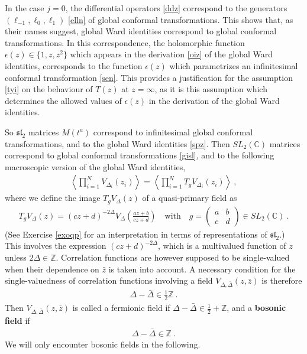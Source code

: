 \documentclass[12pt,a4paper,notitlepage]{report}
\numberwithin{equation}{section}
\theoremstyle{break}
\begin{document}
In the case $j=0$, the differential operators \eqref{ddz} correspond to the generators $(\ell_{-1},\ell_0,\ell_1)$ \eqref{elln} of global conformal transformations.
This shows that, as their names suggest, global Ward identities correspond to global conformal transformations.
In this correspondence, the holomorphic function $\epsilon(z)\in\{1,z,z^2\}$ which appears in the derivation \eqref{oiz} of the global Ward identities, corresponds to the function $\epsilon(z)$ which parametrizes an infinitesimal conformal transformation \eqref{sen}. 
This provides a justification for the assumption \eqref{tyi} on the behaviour of $T(z)$ at $z=\infty$, as it is this assumption which determines the allowed values of $\epsilon(z)$ in the derivation of the global Ward identities. 

So $\mathfrak{sl}_2$ matrices $M(t^a)$ correspond to infinitesimal global conformal transformations, and to the global Ward identities \eqref{spz}.
Then $SL_2({\mathbb{C}})$ matrices correspond to global conformal transformations \eqref{gisl}, and to the following macroscopic version of the global Ward identities,
\begin{align}
\left\langle \prod_{i=1}^N V_{\Delta_i}(z_i)\right\rangle  = \left\langle \prod_{i=1}^N T_g V_{\Delta_i}(z_i) \right\rangle \ , 
\label{vtv}
\end{align}
where we define the image $T_gV_\Delta(z)$ of a quasi-primary field as
\begin{align}
 \boxed{T_g V_\Delta(z) = (cz+d)^{-2\Delta} V_\Delta\left(\frac{az+b}{cz+d}\right)} \quad \text{with} \quad g = \left(\begin{array}{cc} a & b \\ c & d \end{array}\right) \in SL_2({\mathbb{C}})\ .
\label{tgv}
\end{align}
(See Exercise \ref{exoqp} for an interpretation in terms of representations of $\mathfrak{sl}_2$.)
This involves the expression $(cz+d)^{-2\Delta}$, which is a multivalued function of $z$ unless $2\Delta\in {\mathbb{Z}}$.
Correlation functions  are however supposed to be single-valued when their dependence on $\bar{z}$ is taken into account.
A necessary condition for the single-valuedness of correlation functions involving a field $V_{\Delta,\bar{\Delta}}(z,\bar{z})$ is therefore
\begin{align}
 \boxed{\Delta-\bar{\Delta} \in \frac12 {\mathbb{Z}}}\ .
\label{dbd}
\end{align}
Then $V_{\Delta,\bar{\Delta}}(z,\bar{z})$ is called a fermionic field if $\Delta-\bar{\Delta}\in \frac12 +{\mathbb{Z}}$, and a \textbf{bosonic field} if 
\begin{align}
 \Delta-\bar{\Delta} \in {\mathbb{Z}}\ .
\label{dbdz}
\end{align}
We will only encounter bosonic fields in the following.
\end{document}
